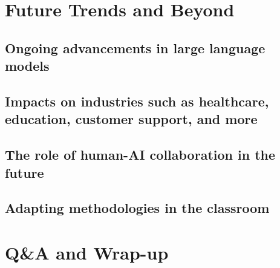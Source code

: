 \documentclass[
]{book}
\begin{document}
\hypertarget{future-trends-and-beyond}{%
\chapter*{Future Trends and Beyond}\label{future-trends-and-beyond}}

\hypertarget{ongoing-advancements-in-large-language-models}{%
\section*{Ongoing advancements in large language models}\label{ongoing-advancements-in-large-language-models}}

\hypertarget{impacts-on-industries-such-as-healthcare-education-customer-support-and-more}{%
\section*{Impacts on industries such as healthcare, education, customer support, and more}\label{impacts-on-industries-such-as-healthcare-education-customer-support-and-more}}

\hypertarget{the-role-of-human-ai-collaboration-in-the-future}{%
\section*{The role of human-AI collaboration in the future}\label{the-role-of-human-ai-collaboration-in-the-future}}

\hypertarget{adapting-methodologies-in-the-classroom}{%
\section*{Adapting methodologies in the classroom}\label{adapting-methodologies-in-the-classroom}}

\hypertarget{qa-and-wrap-up}{%
\chapter*{Q\&A and Wrap-up}\label{qa-and-wrap-up}}
\end{document}
